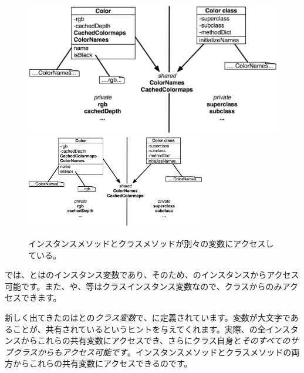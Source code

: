 \documentclass[a4paper,10pt,twoside]{book}
\begin{document}
\begin{figure}[htb]
\begin{center}
\ifluluelse
	{\includegraphics[width=\textwidth]{privateSharedVarColor}}
	{\includegraphics[width=0.7\textwidth]{privateSharedVarColor}}
\caption{インスタンスメソッドとクラスメソッドが別々の変数にアクセスしている。}
\end{center}
\end{figure}

では、とはのインスタンス変数であり、そのため、のインスタンスからアクセス可能です。また、や、等はクラスインスタンス変数なので、クラスからのみアクセスできます。

新しく出てきたのはとの\emph{クラス変数}で、に定義されています。変数が大文字であることが、共有されているというヒントを与えてくれます。実際、の全インスタンスからこれらの共有変数にアクセスでき、さらにクラス自身と\emph{そのすべてのサブクラスからもアクセス可能です}。インスタンスメソッドとクラスメソッドの両方からこれらの共有変数にアクセスできるのです。

\end{document}
